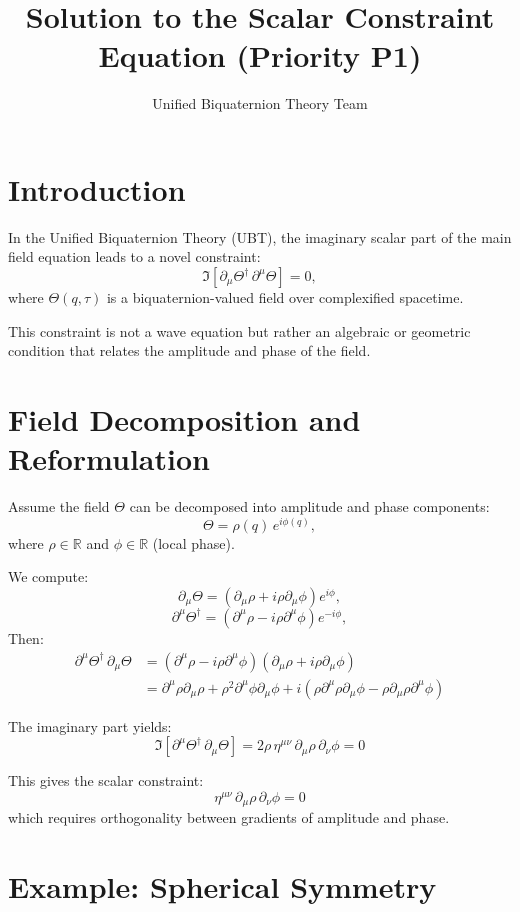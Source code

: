 \documentclass[12pt]{article}
\title{Solution to the Scalar Constraint Equation (Priority P1)}
\author{Unified Biquaternion Theory Team}
\date{}
\begin{document}
\maketitle

\section{Introduction}

In the Unified Biquaternion Theory (UBT), the imaginary scalar part of the main field equation leads to a novel constraint:
\[
\Im \left[\partial_\mu \Theta^\dagger \, \partial^\mu \Theta \right] = 0,
\]
where $\Theta(q, \tau)$ is a biquaternion-valued field over complexified spacetime.

This constraint is not a wave equation but rather an algebraic or geometric condition that relates the amplitude and phase of the field.

\section{Field Decomposition and Reformulation}

Assume the field $\Theta$ can be decomposed into amplitude and phase components:
\[
\Theta = \rho(q) \, e^{i\phi(q)},
\]
where $\rho \in \mathbb{R}$ and $\phi \in \mathbb{R}$ (local phase).

We compute:
\[
\partial_\mu \Theta = (\partial_\mu \rho + i\rho \partial_\mu \phi) e^{i\phi},
\]
\[
\partial^\mu \Theta^\dagger = (\partial^\mu \rho - i\rho \partial^\mu \phi) e^{-i\phi},
\]
Then:
\begin{align*}
\partial^\mu \Theta^\dagger \, \partial_\mu \Theta &= (\partial^\mu \rho - i\rho \partial^\mu \phi)(\partial_\mu \rho + i\rho \partial_\mu \phi) \\
&= \partial^\mu \rho \partial_\mu \rho + \rho^2 \partial^\mu \phi \partial_\mu \phi + i \left( \rho \partial^\mu \rho \partial_\mu \phi - \rho \partial_\mu \rho \partial^\mu \phi \right)
\end{align*}

The imaginary part yields:
\[
\Im \left[ \partial^\mu \Theta^\dagger \, \partial_\mu \Theta \right] = 2\rho \, \eta^{\mu\nu} \, \partial_\mu \rho \, \partial_\nu \phi = 0
\]

This gives the scalar constraint:
\[
\eta^{\mu\nu} \, \partial_\mu \rho \, \partial_\nu \phi = 0
\]
which requires orthogonality between gradients of amplitude and phase.

\section{Example: Spherical Symmetry}
\end{document}
